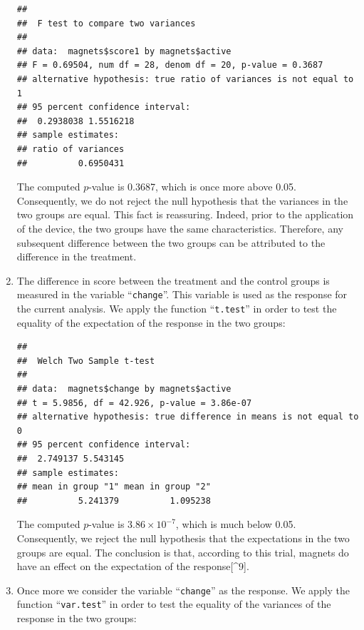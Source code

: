 \documentclass[
]{krantz}
\makeatletter
\newenvironment{Shaded}{\begin{snugshade}}{\end{snugshade}}
\newcommand{\KeywordTok}[1]{\textcolor[rgb]{0.13,0.29,0.53}{\textbf{#1}}}
\newcommand{\NormalTok}[1]{#1}
\newcommand{\OperatorTok}[1]{\textcolor[rgb]{0.81,0.36,0.00}{\textbf{#1}}}
\newcommand{\StringTok}[1]{\textcolor[rgb]{0.31,0.60,0.02}{#1}}
\newenvironment{kframe}{%
\medskip{}
\setlength{\fboxsep}{.8em}
 \def\at@end@of@kframe{}%
 \ifinner\ifhmode%
  \def\at@end@of@kframe{\end{minipage}}%
  \begin{minipage}{\columnwidth}%
 \fi\fi%
 \def\FrameCommand##1{\hskip\@totalleftmargin \hskip-\fboxsep
 \colorbox{shadecolor}{##1}\hskip-\fboxsep
     \hskip-\linewidth \hskip-\@totalleftmargin \hskip\columnwidth}%
 \MakeFramed {\advance\hsize-\width
   \@totalleftmargin\z@ \linewidth\hsize
   \@setminipage}}%
 {\par\unskip\endMakeFramed%
 \at@end@of@kframe}
\renewenvironment{Shaded}{\begin{kframe}}{\end{kframe}}
\theoremstyle{definition}
\theoremstyle{definition}
\theoremstyle{definition}
\theoremstyle{remark}
\makeatother
\begin{document}
\begin{enumerate}
\begin{verbatim}
## 
##  F test to compare two variances
## 
## data:  magnets$score1 by magnets$active
## F = 0.69504, num df = 28, denom df = 20, p-value = 0.3687
## alternative hypothesis: true ratio of variances is not equal to 1
## 95 percent confidence interval:
##  0.2938038 1.5516218
## sample estimates:
## ratio of variances 
##          0.6950431
\end{verbatim}

  The computed \(p\)-value is 0.3687, which is once more above 0.05.
  Consequently, we do not reject the null hypothesis that the variances in
  the two groups are equal. This fact is reassuring. Indeed, prior to the
  application of the device, the two groups have the same characteristics.
  Therefore, any subsequent difference between the two groups can be
  attributed to the difference in the treatment.
\item
  The difference in score between the
  treatment and the control groups is measured in the variable ``\texttt{change}''.
  This variable is used as the response for the current analysis. We apply
  the function ``\texttt{t.test}'' in order to test the equality of the expectation
  of the response in the two groups:

\begin{Shaded}
\end{Shaded}

\begin{verbatim}
## 
##  Welch Two Sample t-test
## 
## data:  magnets$change by magnets$active
## t = 5.9856, df = 42.926, p-value = 3.86e-07
## alternative hypothesis: true difference in means is not equal to 0
## 95 percent confidence interval:
##  2.749137 5.543145
## sample estimates:
## mean in group "1" mean in group "2" 
##          5.241379          1.095238
\end{verbatim}

  The computed \(p\)-value is \(3.86\times 10^{-7}\), which is much below
  0.05. Consequently, we reject the null hypothesis that the expectations
  in the two groups are equal. The conclusion is that, according to this
  trial, magnets do have an effect on the expectation of the response{[}\^{}9{]}.
\item
  Once more we consider the variable
  ``\texttt{change}'' as the response. We apply the function ``\texttt{var.test}'' in order
  to test the equality of the variances of the response in the two groups:


\end{enumerate}
\end{document}
